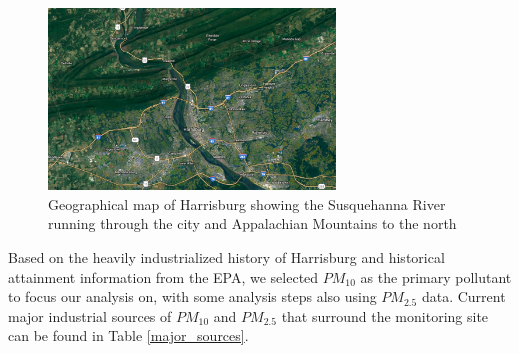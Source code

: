 \documentclass[11pt,journal]{IEEEtran}
\begin{document}
\begin{figure}[htbp]
\centering
\includegraphics[width=3in]{figs/map}
\caption{Geographical map of Harrisburg showing the Susquehanna River running through the city and Appalachian Mountains to the north}
\label{map}
\end{figure}



Based on the heavily industrialized history of Harrisburg and historical attainment information from the EPA, we selected $PM_{10}$ as the primary pollutant to focus our analysis on, with some analysis steps also using $PM_{2.5}$ data. Current major industrial sources of $PM_{10}$ and $PM_{2.5}$ that surround the monitoring site can be found in Table \ref{major_sources}. 
\end{document}
